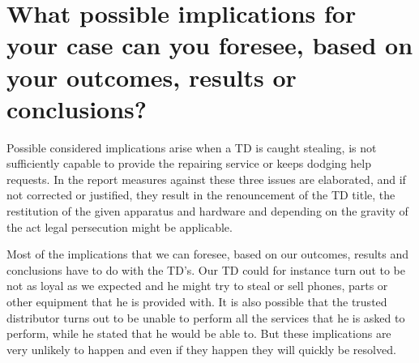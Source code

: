 \section{What possible implications for your case can you foresee, based on your outcomes, results or conclusions?}

Possible considered implications arise when a TD is caught stealing, is not sufficiently capable to provide the repairing service or keeps dodging help requests. In the report measures against these three issues are elaborated, and if not corrected or justified, they result in the renouncement of the TD title, the restitution of the given apparatus and hardware and depending on the gravity of the act legal persecution might be applicable.

Most of the implications that we can foresee, based on our outcomes, results and conclusions have to do with the TD's. Our TD could for instance turn out to be not as loyal as we expected and he might try to steal or sell phones, parts or other equipment that he is provided with. It is also possible that the trusted distributor turns out to be unable to perform all the services that he is asked to perform, while he stated that he would be able to. But these implications are very unlikely to happen and even if they happen they will quickly be resolved.